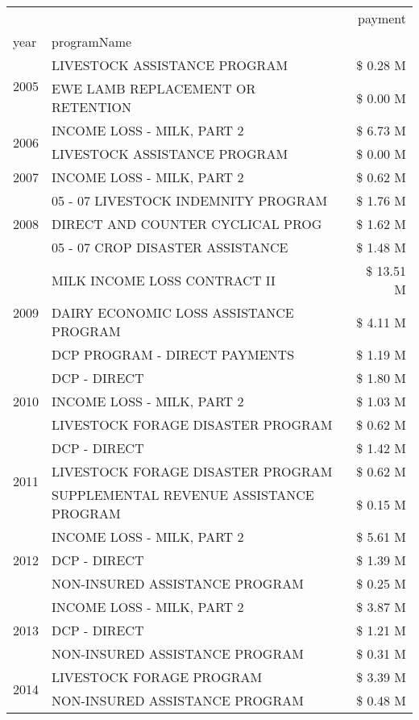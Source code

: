 \begin{tabular}{llr}
\toprule
 &  & payment \\
year & programName &  \\
\midrule
\multirow[t]{2}{*}{2005} & LIVESTOCK ASSISTANCE PROGRAM & \$ 0.28 M \\
 & EWE LAMB REPLACEMENT OR RETENTION & \$ 0.00 M \\
\cline{1-3}
\multirow[t]{2}{*}{2006} & INCOME LOSS - MILK, PART 2 & \$ 6.73 M \\
 & LIVESTOCK ASSISTANCE PROGRAM & \$ 0.00 M \\
\cline{1-3}
2007 & INCOME LOSS - MILK, PART 2 & \$ 0.62 M \\
\cline{1-3}
\multirow[t]{3}{*}{2008} & 05 - 07 LIVESTOCK INDEMNITY PROGRAM & \$ 1.76 M \\
 & DIRECT AND COUNTER CYCLICAL PROG & \$ 1.62 M \\
 & 05 - 07 CROP DISASTER ASSISTANCE & \$ 1.48 M \\
\cline{1-3}
\multirow[t]{3}{*}{2009} & MILK INCOME LOSS CONTRACT II & \$ 13.51 M \\
 & DAIRY ECONOMIC LOSS ASSISTANCE PROGRAM & \$ 4.11 M \\
 & DCP PROGRAM - DIRECT PAYMENTS & \$ 1.19 M \\
\cline{1-3}
\multirow[t]{3}{*}{2010} & DCP - DIRECT & \$ 1.80 M \\
 & INCOME LOSS - MILK, PART 2 & \$ 1.03 M \\
 & LIVESTOCK FORAGE DISASTER PROGRAM & \$ 0.62 M \\
\cline{1-3}
\multirow[t]{3}{*}{2011} & DCP - DIRECT & \$ 1.42 M \\
 & LIVESTOCK FORAGE DISASTER PROGRAM & \$ 0.62 M \\
 & SUPPLEMENTAL REVENUE ASSISTANCE PROGRAM & \$ 0.15 M \\
\cline{1-3}
\multirow[t]{3}{*}{2012} & INCOME LOSS - MILK, PART 2 & \$ 5.61 M \\
 & DCP - DIRECT & \$ 1.39 M \\
 & NON-INSURED ASSISTANCE PROGRAM & \$ 0.25 M \\
\cline{1-3}
\multirow[t]{3}{*}{2013} & INCOME LOSS - MILK, PART 2 & \$ 3.87 M \\
 & DCP - DIRECT & \$ 1.21 M \\
 & NON-INSURED ASSISTANCE PROGRAM & \$ 0.31 M \\
\cline{1-3}
\multirow[t]{3}{*}{2014} & LIVESTOCK FORAGE PROGRAM & \$ 3.39 M \\
 & NON-INSURED ASSISTANCE PROGRAM & \$ 0.48 M \\

\end{tabular}

